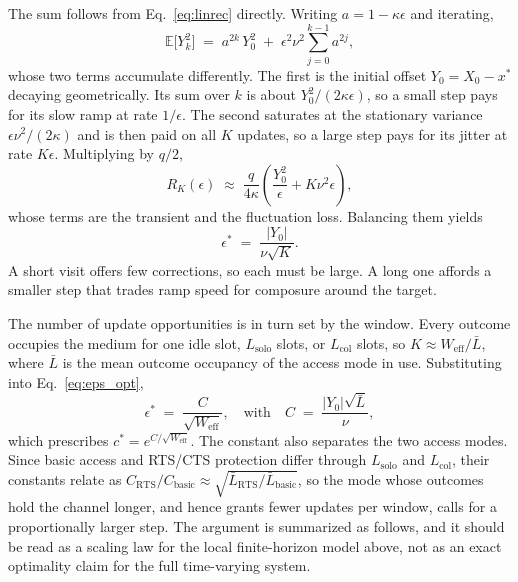 \documentclass[journal,10pt]{IEEEtran}
\begin{document}
The sum follows from Eq.~\eqref{eq:linrec} directly. Writing $a=1-\kappa\epsilon$ and iterating,
\begin{equation}
    \mathbb{E}\bigl[Y_k^2\bigr] \;=\; a^{2k}\,Y_0^2
    \;+\; \epsilon^2\nu^2\sum_{j=0}^{k-1}a^{2j},
    \label{eq:second_moment}
\end{equation}
whose two terms accumulate differently. The first is the initial offset $Y_0=X_0-x^*$ decaying geometrically. Its sum over $k$ is about $Y_0^2/(2\kappa\epsilon)$, so a small step pays for its slow ramp at rate $1/\epsilon$. The second saturates at the stationary variance $\epsilon\nu^2/(2\kappa)$ and is then paid on all $K$ updates, so a large step pays for its jitter at rate $K\epsilon$. Multiplying by $q/2$,
\begin{equation}
    R_K(\epsilon) \;\approx\; \frac{q}{4\kappa}
    \left( \frac{Y_0^2}{\epsilon} + K \nu^2 \epsilon \right),
    \label{eq:regret}
\end{equation}
whose terms are the transient and the fluctuation loss. Balancing them yields
\begin{equation}
    \epsilon^* \;=\; \frac{|Y_0|}{\nu\sqrt{K}}.
    \label{eq:eps_opt}
\end{equation}
A short visit offers few corrections, so each must be large. A long one affords a smaller step that trades ramp speed for composure around the target.

The number of update opportunities is in turn set by the window. Every outcome occupies the medium for one idle slot, $L_\mathrm{solo}$ slots, or $L_\mathrm{col}$ slots, so $K\approx W_\mathrm{eff}/\bar{L}$, where $\bar{L}$ is the mean outcome occupancy of the access mode in use. Substituting into Eq.~\eqref{eq:eps_opt},
\begin{equation}
    \epsilon^* \;=\; \frac{C}{\sqrt{W_\mathrm{eff}}},
    \quad \text{with}\quad
    C \;=\; \frac{|Y_0|\sqrt{\bar{L}}}{\nu},
    \label{eq:eps_window}
\end{equation}
which prescribes $c^*=e^{C/\sqrt{W_\mathrm{eff}}}$. The constant also separates the two access modes. Since basic access and RTS/CTS protection differ through $L_\mathrm{solo}$ and $L_\mathrm{col}$, their constants relate as $C_\mathrm{RTS}/C_\mathrm{basic}\approx\sqrt{\bar{L}_\mathrm{RTS}/\bar{L}_\mathrm{basic}}$, so the mode whose outcomes hold the channel longer, and hence grants fewer updates per window, calls for a proportionally larger step. The argument is summarized as follows, and it should be read as a scaling law for the local finite-horizon model above, not as an exact optimality claim for the full time-varying system.
\end{document}
